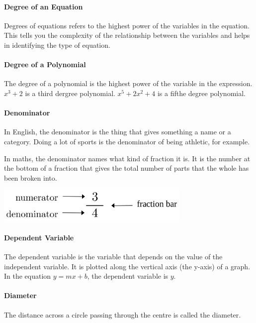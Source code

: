 \documentclass[12pt]{article}
\begin{document}
\paragraph{Degree of an Equation}
Degrees of equations refers to the highest power of the variables in the equation. This tells you the complexity of the relationship between the variables and helps in identifying the type of equation.

\paragraph{Degree of a Polynomial}
The degree of a polynomial is the highest power of the variable in the expression. $x^3+2$ is a third dergree polynomial. $x^5+2x^2+4$ is a fifthe degree polynomial.

\paragraph{Denominator}
In English, the denominator is  the thing that gives something a name or a category. Doing a lot of sports is the denominator of being athletic, for example.

In maths, the denominator names what kind of fraction it is. It is the number at the bottom of a fraction that gives the total number of parts that the whole has been broken into.

\begin{center}
\includegraphics[width=0.7\textwidth]{fraction diagram.png}
\end{center}

\paragraph{Dependent Variable}
The dependent variable is the variable that depends on the value of the independent variable. It is plotted along the vertical axis (the y-axis) of a graph. In the equation \( y = mx + b \), the dependent variable is \( y \).

\paragraph{Diameter}
The distance across a circle passing through the centre is called the diameter.
\end{document}
